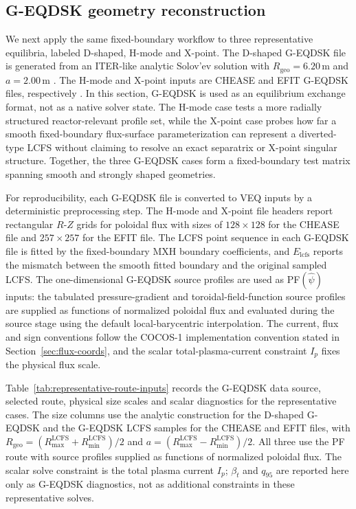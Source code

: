 \documentclass[final, 3p, times]{elsarticle}
\begin{document}
\subsection{G-EQDSK geometry reconstruction}
\label{sec:external-target-reconstruction}

We next apply the same fixed-boundary workflow to three representative equilibria, labeled D-shaped, H-mode and X-point. The D-shaped G-EQDSK file is generated from an ITER-like analytic Solov'ev solution with $R_{\mathrm{geo}}=6.20\,\mathrm{m}$ and $a=2.00\,\mathrm{m}$ \cite{Cerfon2010}. The H-mode and X-point inputs are CHEASE and EFIT G-EQDSK files, respectively \cite{Lutjens1996,Lao1985,FreeQDSKGeqdsk}. In this section, G-EQDSK is used as an equilibrium exchange format, not as a native solver state. The H-mode case tests a more radially structured reactor-relevant profile set, while the X-point case probes how far a smooth fixed-boundary flux-surface parameterization can represent a diverted-type LCFS without claiming to resolve an exact separatrix or X-point singular structure. Together, the three G-EQDSK cases form a fixed-boundary test matrix spanning smooth and strongly shaped geometries.

For reproducibility, each G-EQDSK file is converted to VEQ inputs by a deterministic preprocessing step. The H-mode and X-point file headers report rectangular $R$-$Z$ grids for poloidal flux with sizes of $128\times128$ for the CHEASE file and $257\times257$ for the EFIT file. The LCFS point sequence in each G-EQDSK file is fitted by the fixed-boundary MXH boundary coefficients, and $E_{\mathrm{lcfs}}$ reports the mismatch between the smooth fitted boundary and the original sampled LCFS. The one-dimensional G-EQDSK source profiles are used as PF$(\hat{\psi})$ inputs: the tabulated pressure-gradient and toroidal-field-function source profiles are supplied as functions of normalized poloidal flux and evaluated during the source stage using the default local-barycentric interpolation. The current, flux and sign conventions follow the COCOS-1 implementation convention stated in Section~\ref{sec:flux-coords}, and the scalar total-plasma-current constraint $I_p$ fixes the physical flux scale.

Table~\ref{tab:representative-route-inputs} records the G-EQDSK data source, selected route, physical size scales and scalar diagnostics for the representative cases. The size columns use the analytic construction for the D-shaped G-EQDSK and the G-EQDSK LCFS samples for the CHEASE and EFIT files, with $R_{\mathrm{geo}}=(R_{\max}^{\mathrm{LCFS}}+R_{\min}^{\mathrm{LCFS}})/2$ and $a=(R_{\max}^{\mathrm{LCFS}}-R_{\min}^{\mathrm{LCFS}})/2$. All three use the PF route with source profiles supplied as functions of normalized poloidal flux. The scalar solve constraint is the total plasma current $I_p$; $\beta_t$ and $q_{95}$ are reported here only as G-EQDSK diagnostics, not as additional constraints in these representative solves.
\end{document}
